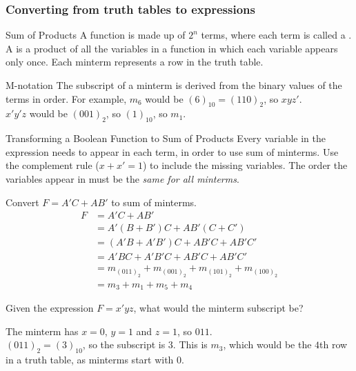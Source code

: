 \documentclass[\main/notes.tex]{subfiles}
\begin{document}
				\subsubsection{Converting from truth tables to expressions}
					\begin{definition}{Sum of Products}
						A function is made up of $2^{n}$ terms, where each term is called a \concept{minterm}. A  is a product of all the variables in a function in which each variable appears only once. Each minterm represents a row in the truth table.
					\end{definition}
					\begin{definition}{M-notation}
						The subscript of a minterm is derived from the binary values of the terms in order. For example, $m_{6}$ would be $(6)_{10} = (110)_{2}$, so $xyz'$.\\
						$x'y'z$ would be $(001)_{2}$, so $(1)_{10}$, so $m_{1}$.
					\end{definition}
					\begin{sidenote}{Transforming a Boolean Function to Sum of Products}
						Every variable in the expression needs to appear in each term, in order to use sum of minterms. Use the complement rule ($x + x' = 1$) to include the missing variables. The order the variables appear in must be the \emph{same for all minterms}.
					\end{sidenote}
					\begin{example}
						Convert $F = A'C + AB'$ to sum of minterms.
						\begin{align*}
							F &= A'C + AB'\\
							  &= A'\left(B + B'\right)C + AB'\left(C + C'\right)\\
								&= \left(A'B + A'B'\right)C + AB'C + AB'C'\\
								&= A'BC + A'B'C + AB'C + AB'C'\\
								&= m_{(011)_{2}} + m_{(001)_{2}} + m_{(101)_{2}} + m_{(100)_{2}}\\
								&= m_{3} + m_{1} + m_{5} + m_{4}
						\end{align*}
					\end{example}
					\begin{example}
						Given the expression $F = x'yz$, what would the minterm subscript be?
						\begin{indentparagraph}
							The minterm has $x = 0$, $y = 1$ and $z = 1$, so $011$.\\
							$(011)_{2} = (3)_{10}$, so the subscript is $3$. This is $m_{3}$, which would be the $4$th row in a truth table, as minterms start with $0$.
						\end{indentparagraph}
					\end{example}
\end{document}
